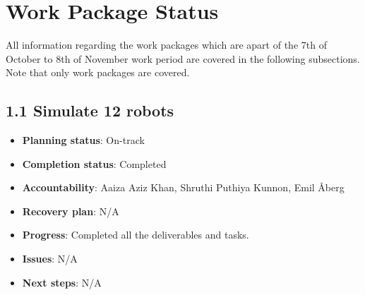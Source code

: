 \section{Work Package Status}



All information regarding the work packages which are apart of the 7th of October to 8th of November work period are covered in the following subsections. Note that only work packages are covered.











\subsection*{1.1 Simulate 12 robots}
\begin{itemize}
    \item \textbf{Planning status}: On-track
    \item \textbf{Completion status}: Completed
    \item \textbf{Accountability}: Aaiza Aziz Khan, Shruthi Puthiya Kunnon, Emil Åberg
    \item \textbf{Recovery plan}: N/A
    \item \textbf{Progress}: Completed all the deliverables and tasks.
    \item \textbf{Issues}: N/A
    \item \textbf{Next steps}: N/A
\end{itemize}

